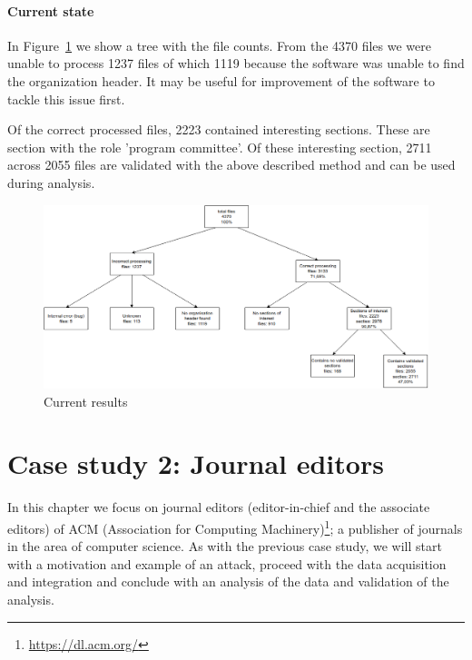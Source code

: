\documentclass{ou-report}
\begin{document}
\subsubsection{Current state}
In Figure~\ref{fig:front_matter_result} we show a tree with the file counts.
From the 4370 files we were unable to process 1237 files of which 1119 
because the software was unable to find the organization header. It may be
useful for improvement of the software to tackle this issue first.

Of the correct processed files, 2223 contained interesting sections. These are
section with the role 'program committee'. Of these interesting section, 2711
across 2055 files are validated with the above described method and can be used
during analysis.

\begin{figure}[H]
    \centering
    \includegraphics[width=17cm]{images/lncs_front_matter_result.png}
    \caption{Current results}
    \label{fig:front_matter_result}
\end{figure}

\chapter{Case study 2: Journal editors}
\label{chp:case2}
In this chapter we focus on journal editors (editor-in-chief and the associate editors) of 
ACM (Association for Computing Machinery)\footnote{\url{https://dl.acm.org/}}; 
a publisher of journals in the area of computer science.
As with the previous case study, we will start with a motivation and example of
an attack, proceed with the data acquisition and integration and conclude with
an analysis of the data and validation of the analysis.
\end{document}
